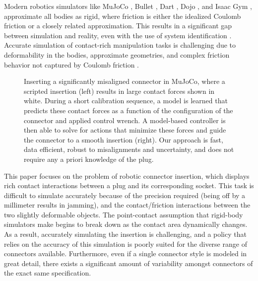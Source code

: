 Modern robotics simulators like MuJoCo \citep{todorov2012}, Bullet \citep{coumans2015}, Dart \citep{lee2018}, Dojo \citep{howell2022}, and Isaac Gym \citep{makoviychuk2021}, approximate all bodies as rigid, where friction is either the idealized Coulomb friction or a closely related approximation. This results in a significant gap between simulation and reality, even with the use of system identification \citep{acary2018, horak2019, chatterjee, elandt2019}. Accurate simulation of contact-rich manipulation tasks is challenging due to deformability in the bodies, approximate geometries, and complex friction behavior not captured by Coulomb friction \citep{drumwright2010}.
\begin{figure}[t]
\centering 
{}
\caption{Inserting a significantly misaligned connector in MuJoCo, where a scripted insertion (left) results in large contact forces shown in white. During a short calibration sequence, a model is learned that predicts these contact forces as a function of the configuration of the connector and applied control wrench. A model-based controller is then able to solve for actions that minimize these forces and guide the connector to a smooth insertion (right). Our approach is fast, data efficient, robust to misalignments and uncertainty, and does not require any a priori knowledge of the plug.
}
\label{fig:mujoco}
\end{figure}


This paper focuses on the problem of robotic connector insertion, which displays rich contact interactions between a plug and its corresponding socket. This task is difficult to simulate accurately because of the precision required (being off by a millimeter results in jamming), and the contact/friction interactions between the two slightly deformable objects. The point-contact assumption that rigid-body simulators make begins to break down as the contact area dynamically changes.  As a result, accurately simulating the insertion is challenging, and a policy that relies on the accuracy of this simulation is poorly suited for the diverse range of connectors available. Furthermore, even if a single connector style is modeled in great detail, there exists a significant amount of variability amongst connectors of the exact same specification.

